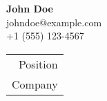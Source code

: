 \documentclass[a4paper,12pt]{article} %
\begin{document}
\begin{center}
    \begin{minipage}{0.6\textwidth}
        \begin{flushleft}
            \textbf{John Doe}\\
            johndoe@example.com\\
            +1 (555) 123-4567
        \end{flushleft}
    \end{minipage}%
    \begin{minipage}{0.4\textwidth}
        \begin{flushright}
            \begin{tabular}{@{}r@{}}
                \\
                Position \\
                Company
            \end{tabular}
        \end{flushright}
    \end{minipage}
\end{center}
\end{document}
